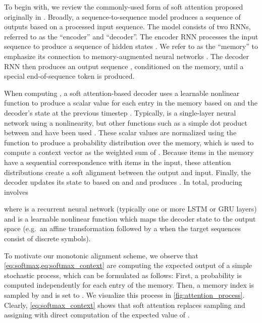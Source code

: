 \documentclass{article}
\begin{document}
To begin with, we review the commonly-used form of soft attention proposed originally in .
Broadly, a sequence-to-sequence model produces a sequence of outputs based on a processed input sequence.
The model consists of two RNNs, referred to as the ``encoder'' and ``decoder''.
The encoder RNN processes the input sequence   to produce a sequence of hidden states .
We refer to  as the ``memory'' to emphasize its connection to memory-augmented neural networks .
The decoder RNN then produces an output sequence , conditioned on the memory, until a special end-of-sequence token is produced.

When computing , a soft attention-based decoder uses a learnable nonlinear function  to produce a scalar value  for each entry  in the memory based on  and the decoder's state at the previous timestep .
Typically,  is a single-layer neural network using a  nonlinearity, but other functions such as a simple dot product between  and  have been used .
These scalar values are normalized using the  function to produce a probability distribution over the memory, which is used to compute a context vector  as the weighted sum of .
Because items in the memory have a sequential correspondence with items in the input, these attention distributions create a soft alignment between the output and input.
Finally, the decoder updates its state to  based on  and  and produces .
In total, producing  involves

where  is a recurrent neural network (typically one or more LSTM  or GRU  layers) and  is a learnable nonlinear function which maps the decoder state to the output space (e.g.\ an affine transformation followed by a  when the target sequences consist of discrete symbols).

To motivate our monotonic alignment scheme, we observe that \cref{eq:softmax,eq:softmax_context} are computing the expected output of a simple stochastic process, which can be formulated as follows:
First, a probability  is computed independently for each entry  of the memory.
Then, a memory index  is sampled by  and  is set to .
We visualize this process in \cref{fig:attention_process}.
Clearly, \cref{eq:softmax_context} shows that soft attention replaces sampling  and assigning  with direct computation of the expected value of .
\end{document}
